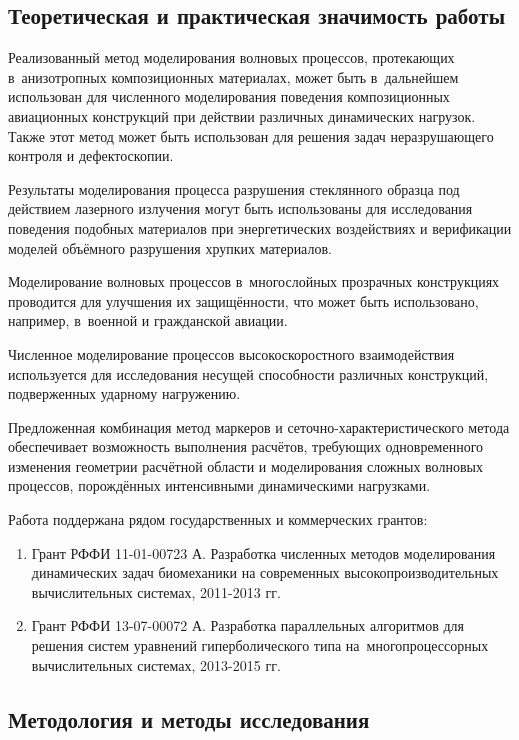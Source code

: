 \documentclass[a4paper,14pt]{extarticle}
\numberwithin{equation}{section}
\begin{document}
    \subsection*{Теоретическая и практическая значимость работы}
    Реализованный метод моделирования волновых процессов, протекающих в~анизотропных композиционных материалах, может быть
    в~дальнейшем использован  для численного моделирования поведения композиционных авиационных конструкций при действии
    различных динамических  нагрузок. Также этот метод может быть использован для решения задач неразрушающего контроля и
    дефектоскопии.

    Результаты моделирования процесса разрушения стеклянного образца под действием лазерного излучения могут быть
    использованы для исследования поведения подобных материалов при энергетических воздействиях и верификации моделей
    объёмного разрушения хрупких материалов.

    Моделирование волновых процессов в~многослойных прозрачных конструкциях проводится для улучшения
    их защищённости, что может быть использовано, например, в~военной и гражданской авиации.

    Численное моделирование процессов высокоскоростного взаимодейст\-вия используется для исследования несущей
    способности различных конструкций, подверженных ударному нагружению.

    Предложенная комбинация метод маркеров и сеточно-ха\-рак\-те\-рис\-ти\-чес\-ко\-го метода обеспечивает
    возможность выполнения расчётов, требующих одновременного изменения геометрии расчётной области и моделирования
    сложных волновых процессов, порождённых интенсивными динамическими нагрузками.

    Работа поддержана рядом государственных и коммерческих грантов:
    \begin{enumerate}
        \item Грант РФФИ 11-01-00723 А. Разработка численных методов моделирования динамических задач биомеханики на
              современных высокопроизводительных вычислительных системах, 2011-2013 гг.
        \item Грант РФФИ 13-07-00072 А. Разработка параллельных алгоритмов для решения систем уравнений гиперболического
              типа на~многопроцессорных вычислительных системах, 2013-2015 гг.
    \end{enumerate}

    \subsection*{Методология и методы исследования}
\end{document}
